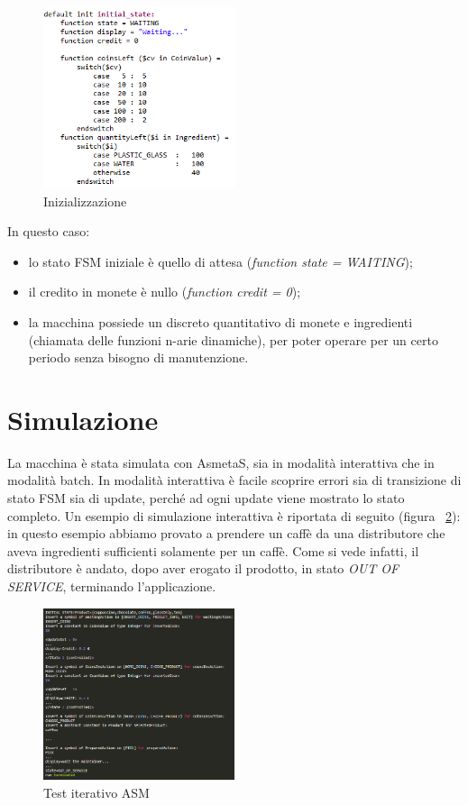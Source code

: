 \begin{figure}[h]
	\centering
	\includegraphics[width=0.5\textwidth]{Immagini/InitialState.png}
	\caption{Inizializzazione}
	\label{fig:initialState}
\end{figure}

In questo caso:
\begin{itemize}
	\item lo stato FSM iniziale è quello di attesa (\textit{function state = WAITING});
	\item il credito in monete è nullo (\textit{function credit = 0});
	\item  la macchina possiede un discreto quantitativo di monete e ingredienti (chiamata delle funzioni n-arie dinamiche), per poter operare per un certo periodo senza bisogno di manutenzione.
\end{itemize}

\section{Simulazione}
La macchina è stata simulata con AsmetaS, sia in modalità interattiva che in modalità batch.
In modalità interattiva è facile scoprire errori sia di transizione di stato FSM sia di update, perché ad ogni update viene mostrato lo stato completo. 
Un esempio di simulazione interattiva è riportata di seguito (figura ~\ref{fig:iterativeExe}): in questo esempio abbiamo provato a prendere un caffè da una distributore che aveva ingredienti sufficienti solamente per un caffè. Come si vede infatti, il distributore è andato, dopo aver erogato il prodotto, in stato \textit{OUT OF SERVICE}, terminando l'applicazione.

\begin{figure}[h]
	\centering
	\includegraphics[width=0.5\textwidth]{Immagini/IterativeRunASM.png}
	\caption{Test iterativo ASM}
	\label{fig:iterativeExe}
\end{figure}

